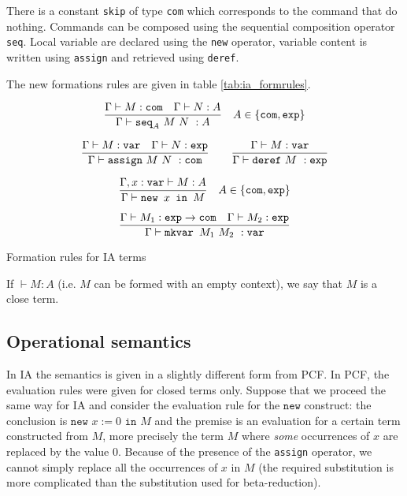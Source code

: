 There is a constant \texttt{skip} of type \texttt{com} which corresponds to the command that do
nothing. Commands can be composed using the sequential composition operator \texttt{seq}.
Local variable are declared using the \texttt{new} operator, variable content is written
using \texttt{assign} and retrieved using \texttt{deref}.

The new formations rules are given in table \ref{tab:ia_formrules}.

\begin{table}[htbp]
$$ \frac{\displaystyle \Gamma \vdash M : \texttt{com} \quad \Gamma \vdash N :A}{\Gamma \vdash \texttt{seq}_A \ M\ N\ : A} \quad A \in \{ \texttt{com}, \texttt{exp}\}$$

$$ \frac{\displaystyle \Gamma \vdash M : \texttt{var} \quad \Gamma \vdash N : \texttt{exp}}{\Gamma \vdash \texttt{assign}\ M\ N\ : \texttt{com}}
\qquad
 \frac{\displaystyle \Gamma \vdash M : \texttt{var}}{\Gamma \vdash \texttt{deref}\ M\ : \texttt{exp}}$$

$$ \frac{\displaystyle \Gamma, x : \texttt{var} \vdash M : A}{\Gamma \vdash \texttt{new } x \texttt{ in } M} \quad A \in \{ \texttt{com}, \texttt{exp}\}$$

$$ \frac{\displaystyle \Gamma \vdash M_1 : \texttt{exp} \rightarrow \texttt{com} \quad \Gamma \vdash M_2 : \texttt{exp}}{\Gamma \vdash \texttt{mkvar } M_1\ M_2\ : \texttt{var}}$$

\caption{Formation rules for IA terms}
\label{tab:ia_formrules}
\end{table}

If $\vdash M : A$ (i.e. $M$ can be formed with an empty context), we say that $M$ is a close term.

\subsection{Operational semantics}

In IA the semantics is given in a slightly different form from PCF.
In PCF, the evaluation rules were given for closed terms only. Suppose that we
proceed the same way for IA and consider the evaluation rule for the $\texttt{new}$ construct:
the conclusion is $\texttt{new } x:=0 \texttt{ in } M$ and the premise
is an evaluation for a certain term constructed from $M$, more precisely the term $M$
where \emph{some} occurrences of $x$ are replaced by the value $0$.
Because of the presence of the \texttt{assign} operator, we cannot simply replace all
the occurrences of $x$ in $M$ (the required substitution is  more complicated
than the substitution used for beta-reduction).


